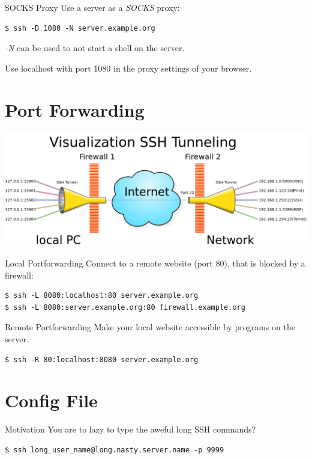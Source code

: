 \documentclass[10pt,graphics,aspectratio=169,table]{beamer}
\begin{document}
\begin{frame}[fragile]{SOCKS Proxy}
	Use a server as a \textit{SOCKS} proxy:
	\begin{lstlisting}
$ ssh -D 1080 -N server.example.org
	\end{lstlisting}
	\textit{-N} can be used to not start a shell on the server.

	Use localhost with port 1080 in the proxy settings of your browser.
\end{frame}

\section{Port Forwarding}
\begin{frame}
	\includegraphics[width=\textwidth]{img/tunnel.png} \cite{tunnel}
\end{frame}

\begin{frame}[fragile]{Local Portforwarding}
	Connect to a remote website (port 80), that is blocked by a firewall:
	\begin{lstlisting}
$ ssh -L 8080:localhost:80 server.example.org
$ ssh -L 8080:server.example.org:80 firewall.example.org
	\end{lstlisting}
\end{frame}

\begin{frame}[fragile]{Remote Portforwarding}
	Make your local website accessible by programs on the server.
	\begin{lstlisting}
$ ssh -R 80:localhost:8080 server.example.org
	\end{lstlisting}
\end{frame}

\section{Config File}
\begin{frame}[fragile]{Motivation}
	You are to lazy to type the aweful long SSH commands?
	\begin{lstlisting}
$ ssh long_user_name@long.nasty.server.name -p 9999
	\end{lstlisting}
\end{frame}
\end{document}

